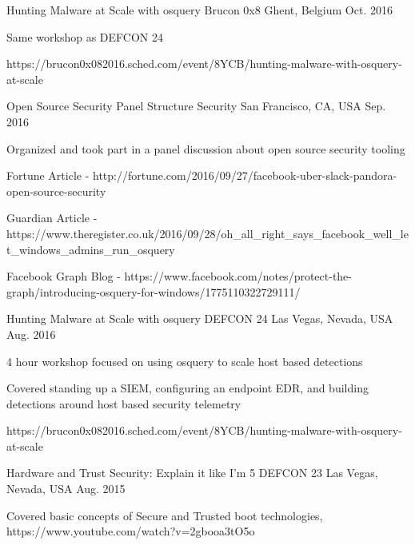\begin{cventries}

\cventry
{Hunting Malware at Scale with osquery} %
{Brucon 0x8} %
{Ghent, Belgium} %
{Oct. 2016} %
{ %
\begin{cvitems}
\item {Same workshop as DEFCON 24}
\item {https://brucon0x082016.sched.com/event/8YCB/hunting-malware-with-osquery-at-scale}
\end{cvitems}
}


\cventry
{Open Source Security Panel} %
{Structure Security} %
{San Francisco, CA, USA} %
{Sep. 2016} %
{ %
\begin{cvitems}
\item {Organized and took part in a panel discussion about open source security tooling}
\item {Fortune Article - http://fortune.com/2016/09/27/facebook-uber-slack-pandora-open-source-security}
\item {Guardian Article - https://www.theregister.co.uk/2016/09/28/oh\_all\_right\_says\_facebook\_well\_let\_windows\_admins\_run\_osquery}
\item {Facebook Graph Blog - https://www.facebook.com/notes/protect-the-graph/introducing-osquery-for-windows/1775110322729111/}
\end{cvitems}
}


\cventry
{Hunting Malware at Scale with osquery} %
{DEFCON 24} %
{Las Vegas, Nevada, USA} %
{Aug. 2016} %
{ %
\begin{cvitems}
\item {4 hour workshop focused on using osquery to scale host based detections}
\item {Covered standing up a SIEM, configuring an endpoint EDR, and building detections around host based security telemetry}
\item {https://brucon0x082016.sched.com/event/8YCB/hunting-malware-with-osquery-at-scale}
\end{cvitems}
}


\cventry
{Hardware and Trust Security: Explain it like I’m 5} %
{DEFCON 23} %
{Las Vegas, Nevada, USA} %
{Aug. 2015} %
{ %
\begin{cvitems}
\item {Covered basic concepts of Secure and Trusted boot technologies, https://www.youtube.com/watch?v=2gbooa3tO5o}
\end{cvitems}
}


\end{cventries}